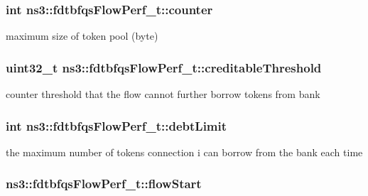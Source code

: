 \subsubsection[{\texorpdfstring{counter}{counter}}]{\setlength{\rightskip}{0pt plus 5cm}int ns3\+::fdtbfqs\+Flow\+Perf\+\_\+t\+::counter}\hypertarget{structns3_1_1fdtbfqsFlowPerf__t_a18996f58f524a200d21ed6bab8d1bdf8}{}\label{structns3_1_1fdtbfqsFlowPerf__t_a18996f58f524a200d21ed6bab8d1bdf8}


maximum size of token pool (byte) 

\subsubsection[{\texorpdfstring{creditable\+Threshold}{creditableThreshold}}]{\setlength{\rightskip}{0pt plus 5cm}uint32\+\_\+t ns3\+::fdtbfqs\+Flow\+Perf\+\_\+t\+::creditable\+Threshold}\hypertarget{structns3_1_1fdtbfqsFlowPerf__t_a7607dde88a053cb2c41b17532368a220}{}\label{structns3_1_1fdtbfqsFlowPerf__t_a7607dde88a053cb2c41b17532368a220}


counter threshold that the flow cannot further borrow tokens from bank 

\subsubsection[{\texorpdfstring{debt\+Limit}{debtLimit}}]{\setlength{\rightskip}{0pt plus 5cm}int ns3\+::fdtbfqs\+Flow\+Perf\+\_\+t\+::debt\+Limit}\hypertarget{structns3_1_1fdtbfqsFlowPerf__t_a3a00b796b2e79a3c3f43c456a2fbd069}{}\label{structns3_1_1fdtbfqsFlowPerf__t_a3a00b796b2e79a3c3f43c456a2fbd069}


the maximum number of tokens connection i can borrow from the bank each time 

\subsubsection[{\texorpdfstring{flow\+Start}{flowStart}}]{ ns3\+::fdtbfqs\+Flow\+Perf\+\_\+t\+::flow\+Start}\hypertarget{structns3_1_1fdtbfqsFlowPerf__t_a001d932bc9da4b0d4fb458411334eef3}{}\label{structns3_1_1fdtbfqsFlowPerf__t_a001d932bc9da4b0d4fb458411334eef3}
